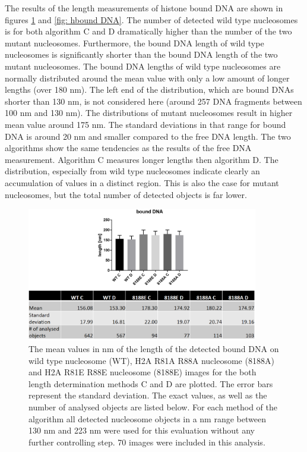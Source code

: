 \documentclass{article}
\begin{document}
The results of the length measurements of histone bound DNA are shown in figures \ref{fig: bound DNA} and \ref{fig: hbound DNA}. The number of detected wild type nucleosomes is for both algorithm C and D dramatically higher than the number of the two mutant nucleosomes. Furthermore, the bound DNA length of wild type nucleosomes is significantly shorter than the bound DNA length of the two mutant nucleosomes. The bound DNA lengths of wild type nucleosomes are normally distributed around the mean value with only a low amount of longer lengths (over 180 nm). The left end of the distribution, which are bound DNAs shorter than 130 nm, is not considered here (around 257 DNA fragments between 100 nm and 130 nm). The distributions of mutant nucleosomes result in higher mean value around 175 nm. The standard deviations in that range for bound DNA is around 20 nm and smaller compared to the free DNA length. The two algorithms show the same tendencies as the results of the free DNA measurement. Algorithm C measures longer lengths then algorithm D. The distribution, especially from wild type nucleosomes indicate clearly an accumulation of values in a distinct region. This is also the case for mutant nucleosomes, but the total number of detected objects is far lower.  
%
\begin{figure}[!htb]
	\begin{center}
		\includegraphics[width = 0.9\textwidth]{bound_DNA}
	\end{center}
	\caption{ The mean values in nm of the length of the detected bound DNA on wild type nucleosome (WT), H2A R81A R88A nucleosome (8188A) and H2A R81E R88E nucleosome (8188E) images for the both length determination methods C and D are plotted. The error bars represent the standard deviation. The exact values, as well as the number of analysed objects are listed below. For each method of the algorithm all detected nucleosome objects in a nm range between 130 nm and 223 nm were used for this evaluation without any further controlling step. 70 images were included in this analysis.}
	\label{fig: bound DNA} %
\end{figure}
\end{document}
